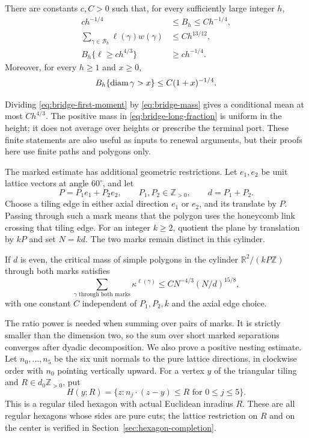 \begin{theorem}\label{thm:finite-bridges}
There are constants $c,C>0$ such that, for every sufficiently large integer $h$,
\begin{align}
 c h^{-1/4}&\le B_h\le C h^{-1/4},\label{eq:bridge-mass}\\
 \sum_{\gamma\in\mathcal B_h}\ell(\gamma)w(\gamma)&\le C h^{13/12},\label{eq:bridge-first-moment}\\
 B_h\{\ell\ge c h^{4/3}\}&\ge c h^{-1/4}.\label{eq:bridge-long-fraction}
\end{align}
Moreover, for every $h\ge1$ and $x\ge0$,
\begin{equation}\label{eq:bridge-diameter}
 B_h\{\operatorname{diam}\gamma>x\}\le C(1+x)^{-1/4}.
\end{equation}
\end{theorem}

Dividing \eqref{eq:bridge-first-moment} by \eqref{eq:bridge-mass} gives a conditional mean at most $Ch^{4/3}$. The positive mass in \eqref{eq:bridge-long-fraction} is uniform in the height; it does not average over heights or prescribe the terminal port. These finite statements are also useful as inputs to renewal arguments, but their proofs here use finite paths and polygons only.

The marked estimate has additional geometric restrictions. Let $e_1,e_2$ be unit lattice vectors at angle $60^\circ$, and let
\[
 P=P_1e_1+P_2e_2,\qquad P_1,P_2\in\mathbb Z_{>0},\qquad d=P_1+P_2.
\]
Choose a tiling edge in either axial direction $e_1$ or $e_2$, and its translate by $P$. Passing through such a mark means that the polygon uses the honeycomb link crossing that tiling edge. For an integer $k\ge2$, quotient the plane by translation by $kP$ and set $N=kd$. The two marks remain distinct in this cylinder.

\begin{theorem}\label{thm:two-marks}\label{u:two-edge-theorem}
If $d$ is even, the critical mass of simple polygons in the cylinder $\mathbb R^2/(kP\mathbb Z)$ through both marks satisfies
\begin{equation}\label{eq:marked-uniform}
 \sum_{\gamma\text{ through both marks}}\kappa^{\ell(\gamma)}
 \le C N^{-4/3}(N/d)^{15/8},
\end{equation}
with one constant $C$ independent of $P_1,P_2,k$ and the axial edge choice.
\end{theorem}

The ratio power is needed when summing over pairs of marks. It is strictly smaller than the dimension two, so the sum over short marked separations converges after dyadic decomposition. We also prove a positive nesting estimate. Let $n_0,\ldots,n_5$ be the six unit normals to the pure lattice directions, in clockwise order with $n_0$ pointing vertically upward. For a vertex $y$ of the triangular tiling and $R\in d_0\mathbb Z_{>0}$, put
\[
 H(y;R)=\{z:n_j\cdot(z-y)\le R\text{ for }0\le j\le5\}.
\]
This is a regular tiled hexagon with actual Euclidean inradius $R$. These are all regular hexagons whose sides are pure cuts; the lattice restriction on $R$ and on the center is verified in Section~\ref{sec:hexagon-completion}.


